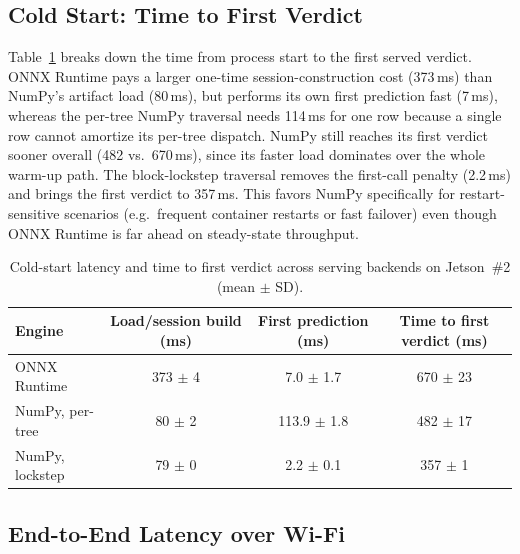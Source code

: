 \documentclass[runningheads]{llncs}
\begin{document}
\subsection{Cold Start: Time to First Verdict}

Table~\ref{tab:coldstart} breaks down the time from process start to the first served verdict. ONNX Runtime pays a larger one-time session-construction cost (373\,ms) than NumPy's artifact load (80\,ms), but performs its own first prediction fast (7\,ms), whereas the per-tree NumPy traversal needs 114\,ms for one row because a single row cannot amortize its per-tree dispatch. NumPy still reaches its first verdict sooner overall (482 vs.\ 670\,ms), since its faster load dominates over the whole warm-up path. The block-lockstep traversal removes the first-call penalty (2.2\,ms) and brings the first verdict to 357\,ms. This favors NumPy specifically for restart-sensitive scenarios (e.g.\ frequent container restarts or fast failover) even though ONNX Runtime is far ahead on steady-state throughput.

\begin{table}[htbp]
  \caption{Cold-start latency and time to first verdict across serving backends on Jetson~\#2 (mean $\pm$ SD).}
  \label{tab:coldstart}
  \centering
  \small
  \begin{tabular}{l c c c}
    \toprule
    Engine & Load/session build (ms) & First prediction (ms) & Time to first verdict (ms) \\
    \midrule
    ONNX Runtime        & 373 $\pm$ 4 & 7.0 $\pm$ 1.7   & 670 $\pm$ 23 \\
    NumPy, per-tree     & 80 $\pm$ 2  & 113.9 $\pm$ 1.8 & 482 $\pm$ 17 \\
    NumPy, lockstep     & 79 $\pm$ 0  & 2.2 $\pm$ 0.1   & 357 $\pm$ 1 \\
    \bottomrule
  \end{tabular}
\end{table}

\subsection{End-to-End Latency over Wi-Fi}
\label{sec:e2e}
\end{document}
